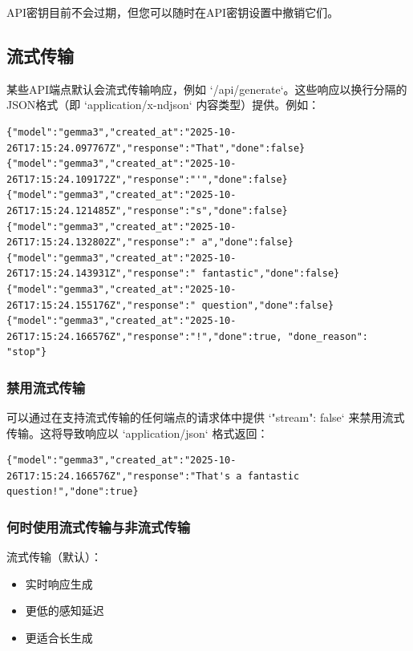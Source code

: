 \documentclass[12pt,UTF8]{ctexbook}
\begin{document}
API密钥目前不会过期，但您可以随时在API密钥设置中撤销它们。

\subsection{流式传输}

某些API端点默认会流式传输响应，例如 `/api/generate`。这些响应以换行分隔的JSON格式（即 `application/x-ndjson` 内容类型）提供。例如：

\begin{verbatim}
{"model":"gemma3","created_at":"2025-10-26T17:15:24.097767Z","response":"That","done":false}
{"model":"gemma3","created_at":"2025-10-26T17:15:24.109172Z","response":"'","done":false}
{"model":"gemma3","created_at":"2025-10-26T17:15:24.121485Z","response":"s","done":false}
{"model":"gemma3","created_at":"2025-10-26T17:15:24.132802Z","response":" a","done":false}
{"model":"gemma3","created_at":"2025-10-26T17:15:24.143931Z","response":" fantastic","done":false}
{"model":"gemma3","created_at":"2025-10-26T17:15:24.155176Z","response":" question","done":false}
{"model":"gemma3","created_at":"2025-10-26T17:15:24.166576Z","response":"!","done":true, "done_reason": "stop"}
\end{verbatim}

\subsubsection{禁用流式传输}

可以通过在支持流式传输的任何端点的请求体中提供 `{"stream": false}` 来禁用流式传输。这将导致响应以 `application/json` 格式返回：

\begin{verbatim}
{"model":"gemma3","created_at":"2025-10-26T17:15:24.166576Z","response":"That's a fantastic question!","done":true}
\end{verbatim}

\subsubsection{何时使用流式传输与非流式传输}

流式传输（默认）：

\begin{itemize}
  \item 实时响应生成
  \item 更低的感知延迟
  \item 更适合长生成
\end{itemize}
\end{document}
